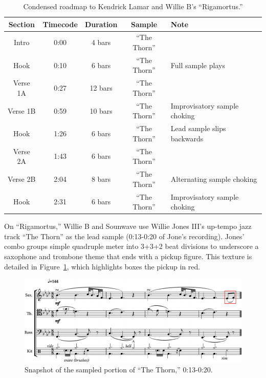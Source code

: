     \begin{table}[ht]
        \centering
            \begin{tabular}{|c|c|c|c|l|}
                \hline
                Section  & Timecode & Duration & Sample        & Note \\ \hline
                Intro    & 0:00     & 4 bars   & ``The Thorn'' & \\ \hline
                Hook     & 0:10     & 6 bars   & ``The Thorn'' & Full sample plays \\ \hline
                Verse 1A & 0:27     & 12 bars  & ``The Thorn'' & \\ \hline
                Verse 1B & 0:59     & 10 bars  & ``The Thorn'' & Improvisatory sample choking \\ \hline
                Hook     & 1:26     & 6 bars   & ``The Thorn'' & Lead sample slips backwards \\ \hline
                Verse 2A & 1:43     & 6 bars   & ``The Thorn'' & \\ \hline
                Verse 2B & 2:04     & 8 bars   & ``The Thorn'' & Alternating sample choking \\ \hline
                Hook     & 2:31     & 6 bars   & ``The Thorn'' & Improvisatory sample choking\\ \hline
            \end{tabular}
        \caption{Condensed roadmap to Kendrick Lamar and Willie B's ``Rigamortus.''}
        \label{tab:rigamortus}
    \end{table}

On ``Rigamortus,'' Willie B and Sounwave use Willie Jones  III's up-tempo jazz track ``The Thorn''
as the lead sample (0:13-0:20 of Jone's recording). Jones' combo groups simple quadruple meter 
into 3+3+2 beat divisions to underscore a saxophone and trombone theme that ends with a pickup
figure. This texture is detailed in Figure~\ref{fig:thethornfull}, which highlights boxes the
pickup in red.

    \begin{figure}[ht]
        \centering
        \includegraphics[width=\textwidth]{images/figures/chp 02/013020thethornfull.pdf}
        \caption{Snapshot of the sampled portion of ``The Thorn,'' 0:13-0:20.}
        \label{fig:thethornfull}
    \end{figure}

